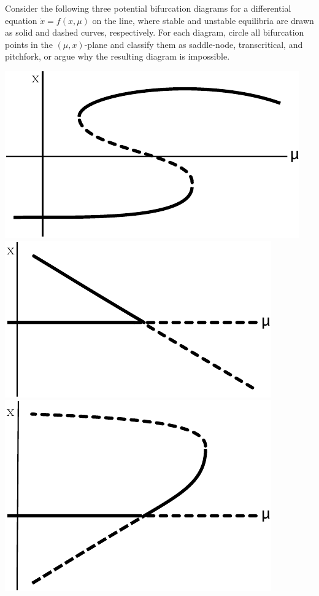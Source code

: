 \documentclass[10pt]{article}
\begin{document}
Consider the following three potential bifurcation diagrams for a differential equation $\dot{x}=f(x,\mu)$ on the line, where stable and unstable equilibria are drawn as solid and dashed curves, respectively. For each diagram, circle all bifurcation points in the $(\mu,x)$-plane and classify them as saddle-node, transcritical, and pitchfork, or argue why the resulting diagram is impossible.
\begin{center}
    \includegraphics[scale=0.7]{Images/Assignment_Figure_2.pdf}\qquad
    \includegraphics[scale=0.7]{Images/Assignment_Figure_3.pdf}\qquad
    \includegraphics[scale=0.7]{Images/Assignment_Figure_4.pdf}
\end{center}
\end{document}
